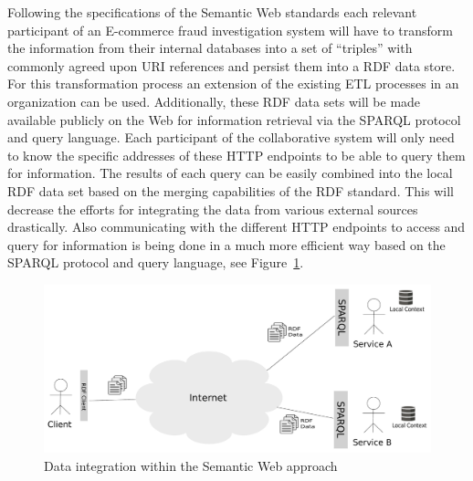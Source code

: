 Following the specifications of the Semantic Web standards each relevant participant of an \gls{E-commerce} fraud investigation system will have to transform the information from their internal databases into a set of ``triples'' with commonly agreed upon \gls{URI} references and persist them into a \gls{RDF} data store. For this transformation process an extension of the existing \gls{ETL} processes in an organization can be used. Additionally, these \gls{RDF} data sets will be made available publicly on the Web for information retrieval via the \gls{SPARQL} protocol and query language. Each participant of the collaborative system will only need to know the specific addresses of these \gls{HTTP} endpoints to be able to query them for information. The results of each query can be easily combined into the local \gls{RDF} data set based on the merging capabilities of the \gls{RDF} standard. This will decrease the efforts for integrating the data from various external sources drastically. Also communicating with the different \gls{HTTP} endpoints to access and query for information is being done in a much more efficient way based on the \gls{SPARQL} protocol and query language, see Figure~\ref{fig:web_data_scenario}. \@

\begin{figure}[H]
  \centering
  \includegraphics[width=0.9\columnwidth]{images/web-data-scenario.pdf}
  \caption{Data integration within the Semantic Web approach}
\label{fig:web_data_scenario}
\end{figure}

